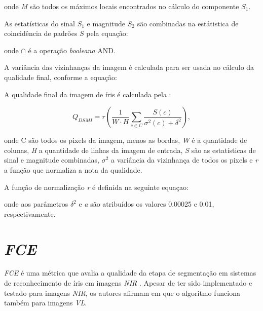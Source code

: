 
\noindent onde \textit{M} são todos os máximos locais encontrados no cálculo do componente $S_{1}$.

\par As estatísticas do sinal \textit{$S_{1}$} e magnitude \textit{$S_{2}$} são combinadas na estátistica de coincidência de padrões $S$ pela equação:


\noindent onde $\cap$ é a operação \textit{booleana} AND.

\par A variância das vizinhanças da imagem é calculada para ser usada no cálculo da qualidade final, conforme a equação:



\par A qualidade final da imagem de íris é calculada pela :

\begin{equation}\label{eq:dsmi:Q}
  Q_{DSMI} = r(\frac{1}{W\cdot H}\sum_{c \in C}\frac{S(c)}{\sigma^2(c) + \delta^2}),
\end{equation}

\noindent onde C são todos os pixels da imagem, menos as bordas, \textit{W} é a quantidade de colunas, \textit{H} a quantidade de linhas da imagem de entrada, \textit{S} são as estatísticas de sinal e magnitude combinadas, $\sigma^{2}$ a variância da vizinhança de todos os pixels e \textit{r} a função que normaliza a nota da qualidade.

\par A função de normalização \textit{r} é definida na seguinte equaçao:

\equacao{eq:dsmi:r}{
    r : [0, \infty) \to [0, 1) \quad x \mapsto 1 - e^{-ax},
}

\noindent onde aos parâmetros $\delta^2$ e \textit{a} são atribuídos os valores 0.00025 e 0.01, respectivamente.


\section{\textit{\acrfull{FCE}}} \label{sec:revisao:fce}

\par \textit{\acrfull{FCE}} é uma métrica que avalia a qualidade da etapa de segmentação em sistemas de reconhecimento de íris em imagens \textit{\acrfull{NIR}} \cite{du2010}. Apesar de ter sido implementado e testado para imagens \textit{\acrshort{NIR}}, os autores afirmam em \cite{zhou2012} que o algoritmo funciona também para imagens \textit{\acrshort{VL}}. 


